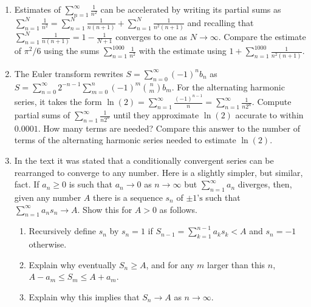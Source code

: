 \documentclass{exercises}
\begin{document}
\begin{enumerate}[resume]
\item \techrequired Estimates of $\sum_{n=1}^{\infty}\frac{1}{n^{2}}$ can be accelerated by writing its partial sums as $\sum_{n=1}^{N}\frac{1}{n^{2}}=\sum_{n=1}^{N}\frac{1}{n(n+1)}+\sum_{n=1}^{N}\frac{1}{n^{2}(n+1)}$ and recalling that $\sum_{n=1}^{N}\frac{1}{n(n+1)}=1-\frac{1}{N+1}$ converges to one as $N\to \infty$. Compare the estimate of $\pi^{2}/6$ using the sums $\sum_{n=1}^{1000}\frac{1}{n^{2}}$ with the estimate using $1+\sum_{n=1}^{1000}\frac{1}{n^{2}(n+1)}$.
\item \techrequired The Euler transform rewrites $S=\sum_{n=0}^{\infty}{(-1)}^{n}b_{n}$ as $S=\sum_{n=0}^{\infty}2^{-n-1}\sum_{m=0}^{n}{(-1)}^{m}\binom{n}{m}b_{m}$. For the alternating harmonic series, it takes the form $\ln(2)=\sum_{n=1}^{\infty}\frac{{(-1)}^{n-1}}{n}=\sum_{n=1}^{\infty}\frac{1}{n2^{n}}$. Compute partial sums of $\sum_{n=1}^{\infty}\frac{1}{n2^{n}}$ until they approximate $\ln(2)$ accurate to within $0.0001$. How many terms are needed? Compare this answer to the number of terms of the alternating harmonic series needed to estimate $\ln(2)$.
\item \techrequired In the text it was stated that a conditionally convergent series can be rearranged to converge to any number. Here is a slightly simpler, but similar, fact. If $a_{n}\ge0$ is such that $a_{n}\to0$ as $n\to \infty$ but $\sum_{n=1}^{\infty}a_{n}$ diverges, then, given any number $A$ there is a sequence $s_{n}$ of $\pm1\text{'s}$ such that $\sum_{n=1}^{\infty}a_{n}s_{n}\to A$. Show this for $A>0$ as follows.
\begin{enumerate}[label=(\alph*)]
  \item Recursively define $s_{n}$ by $s_{n}=1$ if $S_{n-1}=\sum_{k=1}^{n-1}a_{k}s_{k}<A$ and $s_{n}=-1$ otherwise.
  \item Explain why eventually $S_{n}\ge A$, and for any $m$ larger than this $n$, $A-a_{m}\le S_{m}\le A+a_{m}$.
  \item Explain why this implies that $S_{n}\to A$ as $n\to \infty$.
\end{enumerate}
\end{enumerate}
\end{document}
